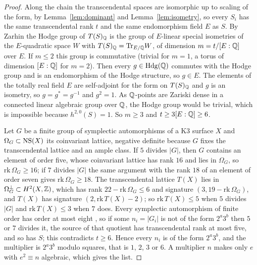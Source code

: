 \begin{proof}
Along the chain the transcendental spaces are isomorphic up to scaling of the form, by Lemma~\ref{lem:dominant} and Lemma~\ref{lem:isometry}, so every $S_{i}$ has the same transcendental rank $t$ and the same endomorphism field $E$ as $S$. By Zarhin \cite[Thms.~2.2.1 and 2.3.1]{Zar83} the Hodge group of $T(S)_{\mathbb{Q}}$ is the group of $E$-linear special isometries of the $E$-quadratic space $W$ with $T(S)_{\mathbb{Q}}=\mathrm{Tr}_{E/\mathbb{Q}}W$, of dimension $m=t/[E:\mathbb{Q}]$ over $E$. If $m\le2$ this group is commutative (trivial for $m=1$, a torus of dimension $[E:\mathbb{Q}]$ for $m=2$). Then every $g\in\mathrm{Hdg}(\mathbb{Q})$ commutes with the Hodge group and is an endomorphism of the Hodge structure, so $g\in E$. The elements of the totally real field $E$ are self-adjoint for the form on $T(S)_{\mathbb{Q}}$ and $g$ is an isometry, so $g=g^{*}=g^{-1}$ and $g^{2}=1$. As $\mathbb{Q}$-points are Zariski dense in a connected linear algebraic group over $\mathbb{Q}$, the Hodge group would be trivial, which is impossible because $h^{2,0}(S)=1$. So $m\ge3$ and $t\ge3[E:\mathbb{Q}]\ge6$.

Let $G$ be a finite group of symplectic automorphisms of a K3 surface $X$ and $\Omega_{G}\subset\mathrm{NS}(X)$ its coinvariant lattice, negative definite because $G$ fixes the transcendental lattice and an ample class. If $5$ divides $|G|$, then $G$ contains an element of order five, whose coinvariant lattice has rank $16$ \cite[\S\,5]{Nik80b} and lies in $\Omega_{G}$, so $\mathrm{rk}\,\Omega_{G}\ge16$; if $7$ divides $|G|$ the same argument with the rank $18$ of an element of order seven gives $\mathrm{rk}\,\Omega_{G}\ge18$. The transcendental lattice $T(X)$ lies in $\Omega_{G}^{\perp}\subset H^{2}(X,\mathbb{Z})$, which has rank $22-\mathrm{rk}\,\Omega_{G}\le6$ and signature $(3,19-\mathrm{rk}\,\Omega_{G})$, and $T(X)$ has signature $(2,\mathrm{rk}\,T(X)-2)$; so $\mathrm{rk}\,T(X)\le5$ when $5$ divides $|G|$ and $\mathrm{rk}\,T(X)\le3$ when $7$ does. Every symplectic automorphism of finite order has order at most eight \cite{Nik80b}, so if some $n_{i}=|G_{i}|$ is not of the form $2^{a}3^{b}$ then $5$ or $7$ divides it, the source of that quotient has transcendental rank at most five, and so has $S$; this contradicts $t\ge6$. Hence every $n_{i}$ is of the form $2^{a}3^{b}$, and the multiplier is $2^{a}3^{b}$ modulo squares, that is $1$, $2$, $3$ or $6$. A multiplier $n$ makes only $e$ with $e^{2}\equiv n$ algebraic, which gives the list.
\end{proof}

